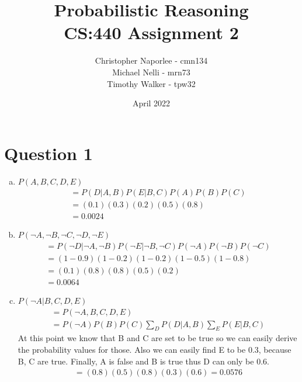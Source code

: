 \documentclass{article}
\title{Probabilistic Reasoning\\CS:440 Assignment 2}
\author{Christopher Naporlee - cmn134\\Michael Nelli - mrn73\\Timothy Walker - tpw32}
\date{April 2022}
\begin{document}
\maketitle
\newpage
\section*{Question 1}
\begin{enumerate}[a)]
    \item $P(A, B, C, D, E)$%
    \begin{gather*}
        = P(D|A, B)P(E|B,C) P(A) P(B) P(C)\\
        = (0.1)(0.3)(0.2)(0.5)(0.8)\\
        = 0.0024
    \end{gather*}

    \item $P(\neg A,\neg B,\neg C,\neg D,\neg E)$%
    \begin{gather*}
        = P(\neg D|\neg A,\neg B)P(\neg E|\neg B,\neg C) P(\neg A) P(\neg B) P(\neg C)\\
        = (1 - 0.9)(1 - 0.2)(1 - 0.2)(1 - 0.5)(1 - 0.8) \\
        = (0.1)(0.8)(0.8)(0.5)(0.2)\\
        = 0.0064
    \end{gather*}

    \item $P(\neg A | B,C,D,E)$
    \begin{gather*}
        = P(\neg A, B, C, D, E) \\
        = P(\neg A) P(B)P(C)\sum_{D}P(D|A,B)\sum_{E}P(E|B,C)
    \end{gather*}
    At this point we know that B and C are set to be true so we can easily derive
    the probability values for those. Also we can easily find E to be 0.3, because B, C are true.
    Finally, A is false and B is true thus D can only be 0.6.
    \begin{gather*}
        = (0.8)(0.5)(0.8)(0.3)(0.6) = 0.0576
    \end{gather*}
\end{enumerate}
\newpage
\end{document}
